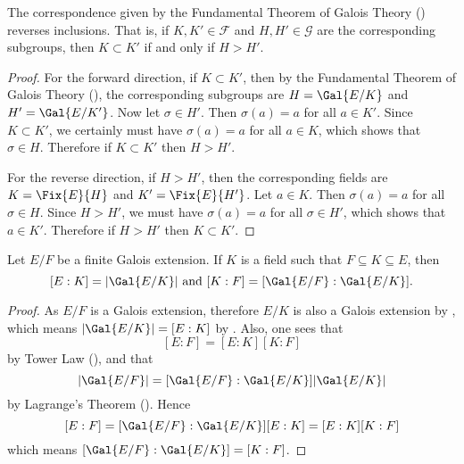 \begin{corollary}\label{corollary-fundamental-theorem-of-galois-theory-is-inclusion-reversing}
    The correspondence given by the Fundamental Theorem of Galois Theory () reverses inclusions. That is, if $K, K' \in \mathcal{F}$ and $H, H' \in \mathcal{G}$ are the corresponding subgroups, then $K \subset K'$ if and only if $H > H'$.
\end{corollary}
\begin{proof}
    For the forward direction, if $K \subset K'$, then by the Fundamental Theorem of Galois Theory (), the corresponding subgroups are $H = \Gal{E/K}$ and $H' = \Gal{E/K'}$. Now let $\sigma \in H'$. Then $\sigma(a) = a$ for all $a \in K'$. Since $K \subset K'$, we certainly must have $\sigma(a) = a$ for all $a \in K$, which shows that $\sigma \in H$. Therefore if $K \subset K'$ then $H > H'$.

    For the reverse direction, if $H > H'$, then the corresponding fields are $K = \Fix{E}{H}$ and $K' = \Fix{E}{H'}$. Let $a \in K$. Then $\sigma(a) = a$ for all $\sigma \in H$. Since $H > H'$, we must have $\sigma(a) = a$ for all $\sigma \in H'$, which shows that $a \in K'$. Therefore if $H > H'$ then $K \subset K'$.
\end{proof}

\begin{corollary}\label{corollary-intermediate-field-galois-field-order}
    Let $E/F$ be a finite Galois extension. If $K$ is a field such that $F \subseteq K \subseteq E$, then
    \[
        [E:K] = |\Gal{E/K}| \text{ and } [K:F] = [\Gal{E/F}:\Gal{E/K}].
    \]
\end{corollary}
\begin{proof}
    As $E/F$ is a Galois extension, therefore $E/K$ is also a Galois extension by , which means $|\Gal{E/K}| = [E:K]$ by . Also, one sees that
    \[
        [E:F] = [E:K][K:F]
    \]
    by Tower Law (), and that
    \[
        |\Gal{E/F}| = [\Gal{E/F}:\Gal{E/K}]|\Gal{E/K}|
    \]
    by Lagrange's Theorem (). Hence
    \[
        [E:F] = [\Gal{E/F}:\Gal{E/K}][E:K] = [E:K][K:F]
    \]
    which means $[\Gal{E/F}:\Gal{E/K}] = [K:F]$.
\end{proof}

